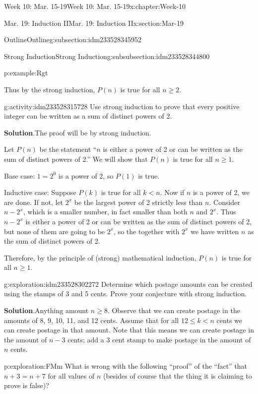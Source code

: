 \documentclass[oneside,10pt,]{book}
\newcommand{\blocktitlefont}{\relax}
\numberwithin{equation}{section}
\renewcommand{\le}{\leqslant}
\renewcommand{\ge}{\geqslant}
\newcommand{\lt}{<}
\begin{document}
\begin{chapterptx}{Week 10: Mar. 15-19}{}{Week 10: Mar. 15-19}{}{}{x:chapter:Week-10}
\begin{sectionptx}{Mar. 19: Induction II}{}{Mar. 19: Induction II}{}{}{x:section:Mar-19}
\begin{subsectionptx}{Outline}{}{Outline}{}{}{g:subsection:idm233528345952}
\begin{subsubsectionptx}{Strong Induction}{}{Strong Induction}{}{}{g:subsubsection:idm233528344800}
\begin{example}{}{p:example:Rgt}
\par
Thus by the strong induction, \(P(n)\) is true for all \(n \ge 2\).%
\end{example}
\begin{activity}{}{g:activity:idm233528315728}%
Use strong induction to prove that every positive integer can be written as a sum of distinct powers of 2.%
\par\smallskip%
\noindent\textbf{\blocktitlefont Solution}.\hypertarget{p:solution:DBA}{}\quad{}The proof will be by strong induction.%
\begin{solutionproof}
Let \(P(n)\) be the statement ``\(n\) is either a power of 2 or can be written as the sum of distinct powers of 2.'' We will show that \(P(n)\) is true for all \(n \ge 1\).%
\par
Base case: \(1 = 2^0\) is a power of 2, so \(P(1)\) is true.%
\par
Inductive case: Suppose \(P(k)\) is true for all \(k \lt n\). Now if \(n\) is a power of 2, we are done. If not, let \(2^x\) be the largest power of 2 strictly less than \(n\). Consider \(n - 2^x\), which is a smaller number, in fact smaller than both \(n\) and \(2^x\). Thus \(n-2^x\) is either a power of 2 or can be written as the sum of distinct powers of 2, but none of them are going to be \(2^x\), so the together with \(2^x\) we have written \(n\) as the sum of distinct powers of 2.%
\par
Therefore, by the principle of (strong) mathematical induction, \(P(n)\) is true for all \(n \ge 1\).%
\end{solutionproof}
\end{activity}%
\begin{exploration}{}{g:exploration:idm233528302272}%
Determine which postage amounts can be created using the stamps of 3 and 5 cents. Prove your conjecture with strong induction.%
\par\smallskip%
\noindent\textbf{\blocktitlefont Solution}.\hypertarget{g:solution:idm233528301600}{}\quad{}Anything amount \(n\ge 8\). Observe that we can create postage in the amounts of 8, 9, 10, 11, and 12 cents. Assume that for all \(12 \le k \lt n\) cents we can create postage in that amount. Note that this means we can create postage in the amount of \(n-3\) cents; add a 3 cent stamp to make postage in the amount of \(n\) cents.%
\end{exploration}%
\begin{exploration}{}{p:exploration:FMm}%
What is wrong with the following ``proof'' of the ``fact'' that \(n+3 = n+7\) for all values of \(n\) (besides of course that the thing it is claiming to prove is false)?%

\end{exploration}
\end{subsubsectionptx}
\end{subsectionptx}
\end{sectionptx}
\end{chapterptx}
\end{document}
